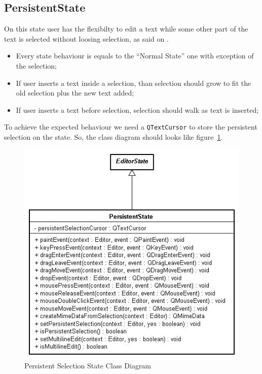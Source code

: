 \documentclass[11pt,a4paper]{report}
\begin{document}
\subsection{PersistentState}
On this state user has the flexibilty to edit a text while some other part of the text is selected without loosing selection, as said on \cite{functional}.

\begin{itemize}
\item Every state behaviour is equals to the ``Normal State'' one with exception of the selection;

\item If user inserts a text inside a selection, than selection should grow to fit the old selection plus the new text added;

\item If user inserts a text before selection, selection should walk as text is inserted;

\end{itemize}

To achieve the expected behaviour we need a \texttt{QTextCursor} to store the persistent selection on the state. So, the class diagram should looks like figure~\ref{persistentstate}.

\begin{figure}[hbt]
\centering
\includegraphics{images/persistentstate.jpg}
\caption{Persistent Selection State Class Diagram} \label{persistentstate}
\end{figure}
\end{document}
